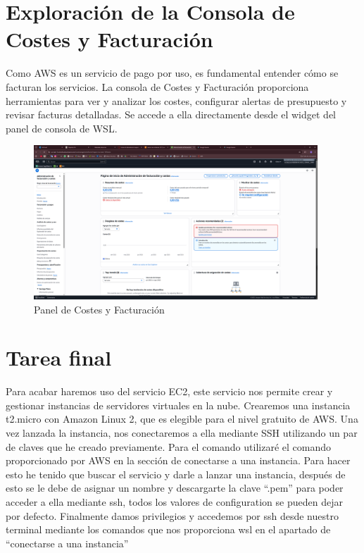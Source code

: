 \documentclass{article}
\begin{document}
	\section{Exploración de la Consola de Costes y Facturación}

	Como AWS es un servicio de pago por uso, es fundamental entender cómo se facturan los servicios. La consola de Costes y Facturación proporciona herramientas para ver y analizar los costes, configurar alertas de presupuesto y revisar facturas detalladas. Se accede a ella directamente desde el widget del panel de consola de WSL.

	\begin{figure}[h!]
	\centering
	\includegraphics[width=0.95\textwidth]{tarea_8.png}
	\caption{Panel de Costes y Facturación}
	\end{figure}
	
	\clearpage

	\section{Tarea final}

	Para acabar haremos uso del servicio EC2, este servicio nos permite crear y gestionar instancias de servidores virtuales en la nube. Crearemos una instancia t2.micro con Amazon Linux 2, que es elegible para el nivel gratuito de AWS. Una vez lanzada la instancia, nos conectaremos a ella mediante SSH utilizando un par de claves que he creado previamente. Para el comando utilizaré el comando proporcionado por AWS en la sección de conectarse a una instancia. Para hacer esto he tenido que buscar el servicio y darle a lanzar una instancia, después de esto se le debe de asignar un nombre y descargarte la clave ``.pem'' para poder acceder a ella mediante ssh, todos los valores de configuration se pueden dejar por defecto. Finalmente damos privilegios y accedemos por ssh desde nuestro terminal mediante los comandos que nos proporciona wsl en el apartado de ``conectarse a una instancia'' 
\end{document}
